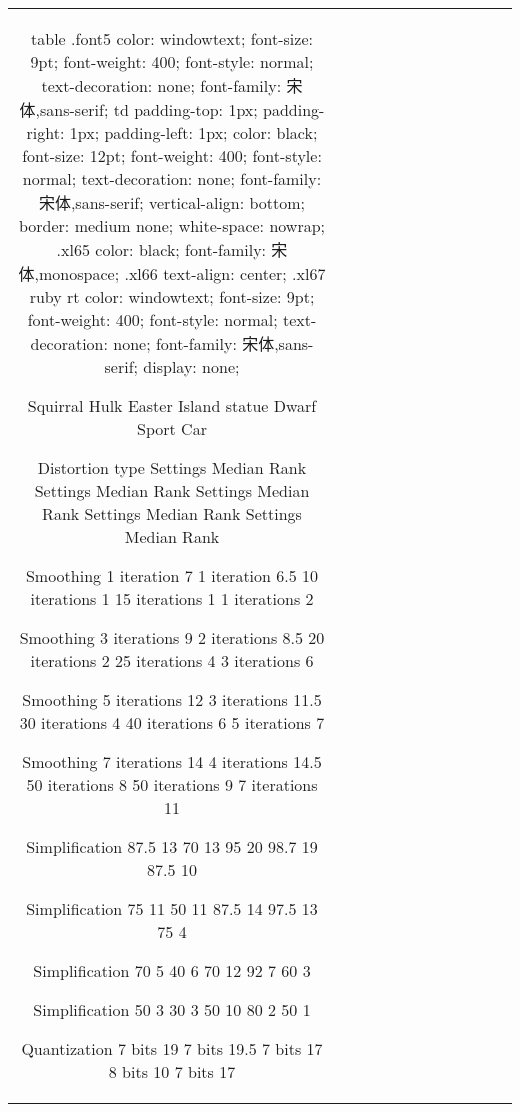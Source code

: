 \begin{table} 
    \begin{tabular}{ c c c c c c c c c c c c }
        table {  }.font5 { color: windowtext; font-size: 9pt; font-weight: 400; font-style: normal; text-decoration: none; font-family: 宋体,sans-serif; }td { padding-top: 1px; padding-right: 1px; padding-left: 1px; color: black; font-size: 12pt; font-weight: 400; font-style: normal; text-decoration: none; font-family: 宋体,sans-serif; vertical-align: bottom; border: medium none; white-space: nowrap; }.xl65 { color: black; font-family: 宋体,monospace; }.xl66 { text-align: center; }.xl67 {  }ruby {  }rt { color: windowtext; font-size: 9pt; font-weight: 400; font-style: normal; text-decoration: none; font-family: 宋体,sans-serif; display: none; }






 
 
 
 
  
  Squirral
  Hulk
  Easter Island statue
  Dwarf
  Sport Car
 
 
  Distortion type
  Settings
  Median Rank
  Settings
  Median Rank
  Settings
  Median Rank
  Settings
  Median Rank
  Settings
  Median Rank
 
 
  Smoothing
  1 iteration
  7
  1 iteration
  6.5
  10 iterations
  1
  15 iterations
  1
  1 iterations
  2
 
 
  Smoothing
  3 iterations
  9
  2 iterations
  8.5
  20 iterations
  2
  25 iterations
  4
  3 iterations
  6
 
 
  Smoothing
  5 iterations
  12
  3 iterations
  11.5
  30 iterations
  4
  40 iterations
  6
  5 iterations
  7
 
 
  Smoothing
  7 iterations
  14
  4 iterations
  14.5
  50 iterations
  8
  50 iterations
  9
  7 iterations
  11
 
 
  Simplification
  87.5%
  13
  70%
  13
  95%
  20
  98.7%
  19
  87.5%
  10
 
 
  Simplification
  75%
  11
  50%
  11
  87.5%
  14
  97.5%
  13
  75%
  4
 
 
  Simplification
  70%
  5
  40%
  6
  70%
  12
  92%
  7
  60%
  3
 
 
  Simplification
  50%
  3
  30%
  3
  50%
  10
  80%
  2
  50%
  1
 
 
  Quantization
  7 bits
  19
  7 bits
  19.5
  7 bits
  17
  8 bits
  10
  7 bits
  17
 

\end{tabular}
\end{table}
